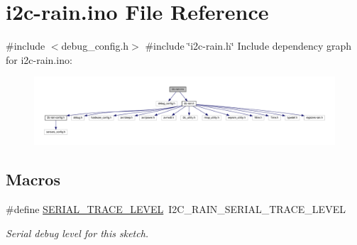 \hypertarget{i2c-rain_8ino}{}\section{i2c-\/rain.ino File Reference}
\label{i2c-rain_8ino}
{\ttfamily \#include $<$debug\+\_\+config.\+h$>$}\newline
{\ttfamily \#include \char`\"{}i2c-\/rain.\+h\char`\"{}}\newline
Include dependency graph for i2c-\/rain.ino\+:
\nopagebreak
\begin{figure}[H]
\begin{center}
\leavevmode
\includegraphics[width=350pt]{i2c-rain_8ino__incl}
\end{center}
\end{figure}
\subsection*{Macros}
\begin{DoxyCompactItemize}
\item 
\mbox{\label{i2c-rain_8ino_a31fa5c36fa17c66feec7a67b76c3e786}} 
\#define \hyperlink{i2c-rain_8ino_a31fa5c36fa17c66feec7a67b76c3e786}{S\+E\+R\+I\+A\+L\+\_\+\+T\+R\+A\+C\+E\+\_\+\+L\+E\+V\+EL}~I2\+C\+\_\+\+R\+A\+I\+N\+\_\+\+S\+E\+R\+I\+A\+L\+\_\+\+T\+R\+A\+C\+E\+\_\+\+L\+E\+V\+EL
\begin{DoxyCompactList}\small\item\em Serial debug level for this sketch. \end{DoxyCompactList}\end{DoxyCompactItemize}
